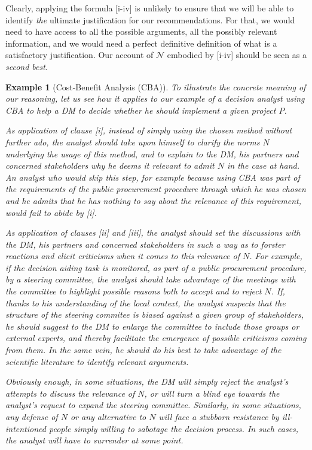 \documentclass[preprint, french, english, 11pt, authoryear]{elsarticle}%
\newtheorem{example}{Example}
\newcommand{\adv}{\mathscr{N}}
\begin{document}
Clearly, applying the formula [i-iv] is unlikely to ensure that we will be able to identify \emph{the} ultimate justification for our recommendations. For that, we would need to have access to all the possible arguments, all the possibly relevant information, and we would need a perfect definitive definition of what is a satisfactory justification. Our account of $\adv$ embodied by [i-iv] should be seen as a \emph{second best}.
\begin{example}[Cost-Benefit Analysis (CBA)]
To illustrate the concrete meaning of our reasoning, let us see how it applies to our example of a decision analyst using CBA to help a \ac{DM} to decide whether he should implement a given project $P$.

As application of clause [i], instead of simply using the chosen method without further ado, the analyst should take upon himself to clarify the norms $N$ underlying the usage of this method, and to explain to the \ac{DM}, his partners and concerned stakeholders why he deems it relevant to admit $N$ in the case at hand. An analyst who would skip this step, for example because using CBA was part of the requirements of the public procurement procedure through which he was chosen and he admits that he has nothing to say about the relevance of this requirement, would fail to abide by [i].

As application of clauses [ii] and [iii], the analyst should set the discussions with the \ac{DM}, his partners and concerned stakeholders in such a way as to forster reactions and elicit criticisms when it comes to this relevance of $N$. For example, if the decision aiding task is monitored, as part of a public procurement procedure, by a steering committee, the analyst should take advantage of the meetings with the committee to highlight possible reasons both to accept and to reject $N$. If, thanks to his understanding of the local context, the analyst suspects that the structure of the steering commitee is biased against a given group of stakeholders, he should suggest to the \ac{DM} to enlarge the committee to include those groups or external experts, and thereby facilitate the emergence of possible criticisms coming from them. In the same vein, he should do his best to take advantage of the scientific literature to identify relevant arguments.  

Obviously enough, in some situations, the \ac{DM} will simply reject the analyst's attempts to discuss the relevance of $N$, or will turn a blind eye towards the analyst's request to expand the steering committee. Similarly, in some situations, any defense of $N$ or any alternative to $N$ will face a stubborn resistance by ill-intentioned people simply willing to sabotage the decision process. In such cases, the analyst will have to surrender at some point.


\end{example}
\end{document}
